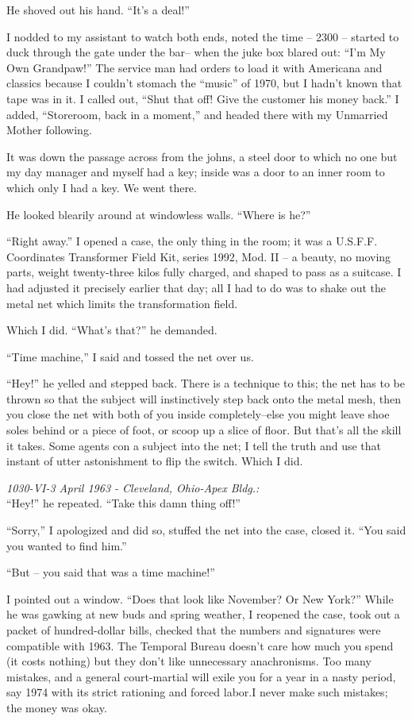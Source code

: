 He shoved out his hand. ``It's a deal!''

I nodded to my assistant to watch both ends, noted  the
time  -- 2300 -- started to duck through the gate under the bar--
when the juke box blared out: ``I'm  My  Own  Grandpaw!''  The
service  man  had orders to load it with Americana and classics
because I couldn't stomach the ``music'' of 1970,  but  I  hadn't
known  that  tape was in it. I called out, ``Shut that off! Give
the customer his money back.'' I added, ``Storeroom, back in  a
moment,'' and headed there with my Unmarried Mother following.

It  was down the passage across from the johns, a steel
door to which no one but my day manager and myself had  a  key;
inside  was  a door to an inner room to which only I had a key.
We went there.

He looked blearily around at windowless walls. ``Where
is he?''

``Right away.'' I opened a case, the only thing in  the
room;  it  was a U.S.F.F. Coordinates Transformer Field Kit,
series 1992, Mod. II  --  a  beauty,  no  moving  parts,  weight
twenty-three  kilos  fully  charged,  and  shaped  to pass as a
suitcase. I had adjusted it precisely earlier that day;  all  I
had  to  do  was  to  shake  out the metal net which limits the
transformation field.

Which I did. ``What's that?'' he demanded.

``Time machine,'' I said and tossed the net over us.

``Hey!''  he  yelled  and  stepped  back.  There  is  a
technique to this; the net has to be thrown so that the subject
will  instinctively  step  back  onto  the metal mesh, then you
close the net with both of you inside completely--else you might
leave shoe soles behind or a piece of foot, or scoop up a slice
of floor. But that's all the skill it takes. Some agents con  a
subject  into the net; I tell the truth and use that instant of
utter astonishment to flip the switch. Which I did.

\emph{1030-VI-3 April  1963  -  Cleveland,  Ohio-Apex  Bldg.:}\\
``Hey!'' he repeated. ``Take this damn thing off!''

``Sorry,'' I apologized and did so, stuffed the net into
the case, closed it. ``You said you wanted to find him.''

``But -- you said that was a time machine!''

I  pointed  out  a  window. ``Does  that  look  like
November? Or New York?'' While he was gawking at new buds and
spring  weather,  I  reopened  the  case,  took out a packet of
hundred-dollar bills, checked that the numbers  and  signatures
were compatible with 1963. The Temporal Bureau doesn't care how
much you  spend  (it  costs  nothing)  but  they  don't  like
unnecessary anachronisms. Too  many  mistakes,  and  a  general
court-martial  will exile you for a year in a nasty period, say
1974 with its strict rationing and forced labor.I never make
such mistakes; the money was okay.

